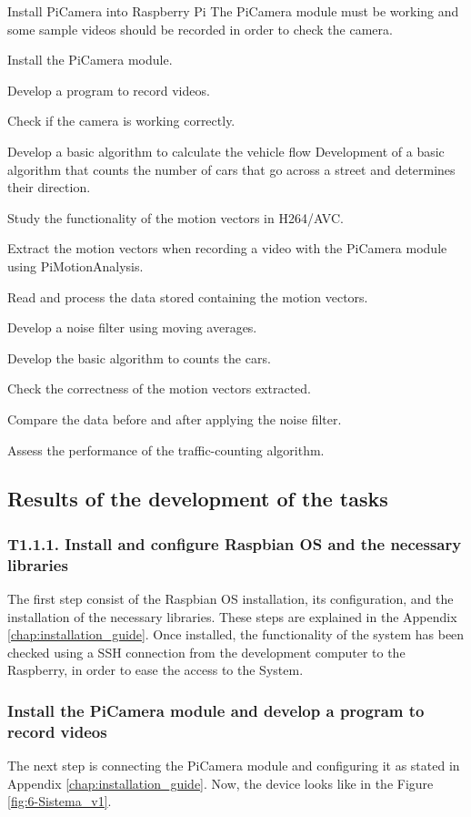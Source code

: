 {Install PiCamera into Raspberry Pi}
{The PiCamera module must be working and some sample videos should be recorded in order to check the camera.}
{	\item Install the PiCamera module.
	\item Develop a program to record videos.
}{	\item Check if the camera is working correctly.
}

{Develop a basic algorithm to calculate the vehicle flow}
{Development of a basic algorithm that counts the number of cars that go across a street and determines their direction.}
{	\item Study the functionality of the motion vectors in H264/AVC.
	\item Extract the motion vectors when recording a video with the PiCamera module using PiMotionAnalysis.
	\item Read and process the data stored containing the motion vectors.
	\item Develop a noise filter using moving averages.
	\item Develop the basic algorithm to counts the cars.
}{	\item Check the correctness of the motion vectors extracted.
	\item Compare the data before and after applying the noise filter.
	\item Assess the performance of the traffic-counting algorithm.
}


\subsection{Results of the development of the tasks}
\subsubsection{T1.1.1. Install and configure Raspbian \ac{OS} and the necessary libraries}
The first step consist of the Raspbian \ac{OS} installation, its configuration, and the installation of the necessary libraries. These steps are explained in the Appendix \ref{chap:installation_guide}. Once installed, the functionality of the system has been checked using a SSH connection from the development computer to the Raspberry, in order to ease the access to the System. 

\subsubsection{Install the PiCamera module and develop a program to record videos}
The next step is connecting the PiCamera module and configuring it as stated in Appendix \ref{chap:installation_guide}. Now, the device looks like in the Figure \ref{fig:6-Sistema_v1}. 

